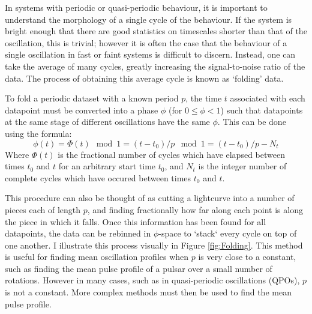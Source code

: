 \par In systems with periodic or quasi-periodic behaviour, it is important to understand the morphology of a single cycle of the behaviour.  If the system is bright enough that there are good statistics on timescales shorter than that of the oscillation, this is trivial; however it is often the case that the behaviour of a single oscillation in fast or faint systems is difficult to discern.  Instead, one can take the average of many cycles, greatly increasing the signal-to-noise ratio of the data.  The process of obtaining this average cycle is known as `folding' data.
\par To fold a periodic dataset with a known period $p$, the time $t$ associated with each datapoint must be converted into a phase $\phi$ (for $0\leq\phi<1$) such that datapoints at the same stage of different oscillations have the same $\phi$.  This can be done using the formula:
\begin{equation}
\phi(t)=\Phi(t)\mod1=(t-t_0)/p\mod1=(t-t_0)/p-N_t
\label{eq:simfold}
\end{equation}
Where $\Phi(t)$ is the fractional number of cycles which have elapsed between times $t_0$ and $t$ for an arbitrary start time $t_0$, and $N_t$ is the integer number of complete cycles which have occured between times $t_0$ and $t$.
\par This procedure can also be thought of as cutting a lightcurve into a number of pieces each of length $p$, and finding fractionally how far along each point is along the piece in which it falls.  Once this information has been found for all datapoints, the data can be rebinned in $\phi$-space to `stack` every cycle on top of one another.  I illustrate this process visually in Figure \ref{fig:Folding}.  This method is useful for finding mean oscillation profiles when $p$ is very close to a constant, such as finding the mean pulse profile of a pulsar over a small number of rotations.  However in many cases, such as in quasi-periodic oscillations (QPOs), $p$ is not a constant.  More complex methods must then be used to find the mean pulse profile.

